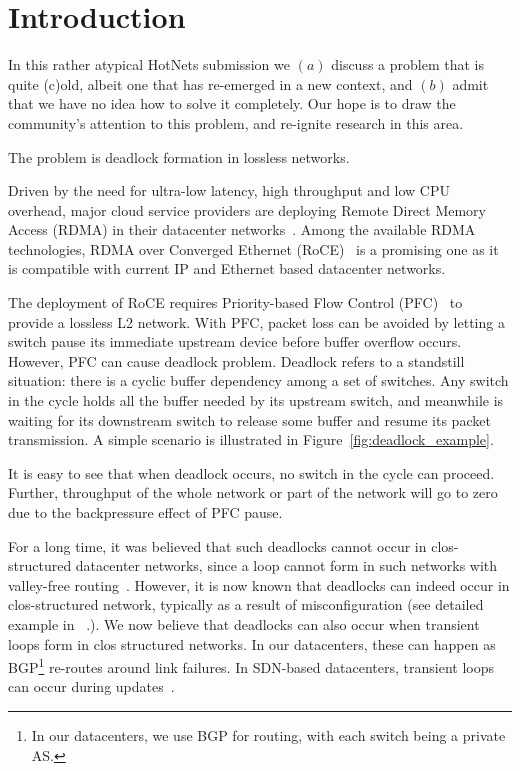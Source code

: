 \secspace
\section{Introduction}
\secspace
\label{sec:intro}

In this rather atypical HotNets submission we $(a)$ discuss a problem that is
quite (c)old, albeit one that has re-emerged in a new context, and $(b)$ admit
that we have no idea how to solve it completely. Our hope is to draw the
community's attention to this problem, and re-ignite research in this area.

The problem is deadlock formation in lossless networks.

Driven by the need for ultra-low latency, high throughput and low CPU overhead,
major cloud service providers are deploying Remote Direct Memory Access (RDMA) in
their datacenter networks~\cite{dcqcn,timely}. Among the
available RDMA technologies,  RDMA over Converged Ethernet (RoCE)~\cite{roce} is
a promising one as it is compatible with current IP and Ethernet based
datacenter networks.

The deployment of RoCE requires Priority-based Flow Control (PFC)~\cite{pfc} to
provide a lossless L2 network. With PFC, packet loss can be avoided by letting a
switch pause its immediate upstream device before buffer overflow occurs.
However, PFC can cause deadlock problem. Deadlock refers to a
standstill situation: there is a cyclic buffer dependency among a set of
switches. Any switch in the cycle holds all the buffer needed by its upstream
switch, and meanwhile is waiting for its downstream switch to release some
buffer and resume its packet transmission. A simple scenario is illustrated in
Figure~\ref{fig:deadlock_example}.

It is easy to see that when deadlock occurs, no switch in the cycle can proceed.
Further, throughput of the whole network or part of the network will go to zero
due to the backpressure effect of PFC pause. 

For a long time, it was believed that such deadlocks cannot occur in
clos-structured datacenter networks, since a loop cannot form in such networks
with valley-free routing~\cite{dcqcn}.  However, it is now known that deadlocks
can indeed occur in clos-structured network, typically as a result of
misconfiguration (see detailed example in ~\cite{rdmascale}.). We now believe
that deadlocks can also occur when transient loops form in clos structured
networks. In our datacenters, these can happen as BGP\footnote{In our 
datacenters, we use BGP for routing, with each switch being a private AS.} re-routes
around link failures. In SDN-based datacenters, transient loops can occur
during updates~\cite{dionysus}.

